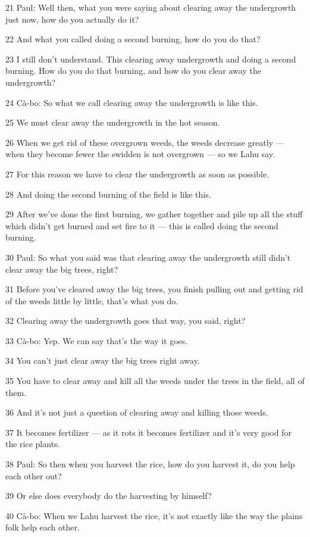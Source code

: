 21 Paul: Well then, what you were saying about clearing away the undergrowth just
now, how do you actually do it?

22 And what you called doing a second burning, how do you do that?

23 I still don't understand. This clearing away undergrowth and doing a second
burning. How do you do that burning, and how do you clear away the undergrowth?

24 Cà-bo: So what we call clearing away the undergrowth is like this.

25 We must clear away the undergrowth in the hot season.

26 When we get rid of these overgrown weeds, the weeds decrease greatly --- when
they become fewer the swidden is not overgrown --- so we Lahu say.

27 For this reason we have to clear the undergrowth as soon as possible.

28 And doing the second burning of the field is like this.

29 After we've done the first burning, we gather together and pile up all the stuff
which didn't get burned and set fire to it --- this is called doing the second
burning.

30 Paul: So what you said was that clearing away the undergrowth still didn't clear
away the big trees, right?

31 Before you've cleared away the big trees, you finish pulling out and getting
rid of the weeds little by little, that's what you do.

32 Clearing away the undergrowth goes that way, you said, right?

33 Cà-bo: Yep. We can say that's the way it goes.

34 You can't just clear away the big trees right away.

35 You have to clear away and kill all the weeds under the trees in the field,
all of them.

36 And it's not just a question of clearing away and killing those weeds.

37 It becomes fertilizer --- as it rots it becomes fertilizer and it's very good
for the rice plants.

38 Paul: So then when you harvest the rice, how do you harvest it, do you help
each other out?

39 Or else does everybody do the harvesting by himself?

40 Cà-bo: When we Lahu harvest the rice, it's not exactly like the way the plains
folk help each other.

